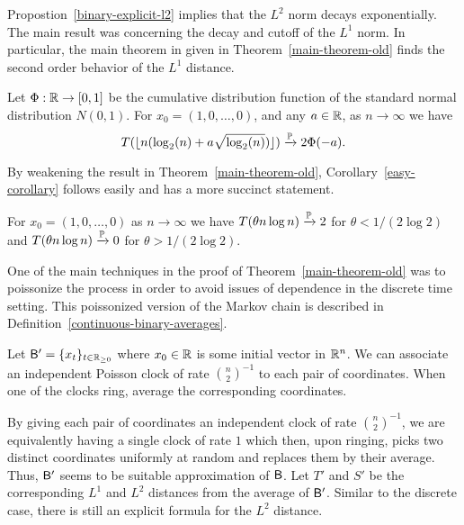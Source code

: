 \documentclass[12pt]{article}
\begin{document}
Propostion~\ref{binary-explicit-l2} implies that the $L^2$ norm decays exponentially. The main result \cite{chatterjee2021phase} was concerning the decay and cutoff of the $L^1$ norm. In particular, the main theorem in \cite{chatterjee2021phase} given in Theorem~\ref{main-theorem-old} finds the second order behavior of the $L^1$ distance. 

\begin{thm} \label{main-theorem-old}
	Let $\Phi : \mathbb{R} \to [0, 1]$ be the cumulative distribution function of the standard normal distribution $N(0, 1)$. For $x_0 = (1, 0, \ldots, 0)$, and any $a \in \mathbb{R}$, as $n \to \infty$ we have 
	\[
		T(\lfloor n(\log_2(n) + a \sqrt{\log_2(n)}) \rfloor) \xrightarrow{\mathbb{P}} 2 \Phi(-a).
	\]
\end{thm}

By weakening the result in Theorem~\ref{main-theorem-old}, Corollary~\ref{easy-corollary} follows easily and has a more succinct statement. 

\begin{cor} \label{easy-corollary}
	For $x_0 = (1, 0, \ldots, 0)$ as $n \to \infty$ we have $T(\theta n \log n) \xrightarrow{\mathbb{P}} 2$ for $\theta < 1/(2 \log 2)$ and $T(\theta n \log n) \xrightarrow{\mathbb{P}} 0$ for $\theta > 1/(2 \log 2)$. 
\end{cor}

One of the main techniques in the proof of Theorem~\ref{main-theorem-old} was to poissonize the process in order to avoid issues of dependence in the discrete time setting. This poissonized version of the Markov chain is described in Definition~\ref{continuous-binary-averages}. 

\begin{defn} \label{continuous-binary-averages}
	Let $\mathsf{B}' = \{x_t\}_{t \in \mathbb{R}_{\geq 0}}$ where $x_0 \in \mathbb{R}$ is some initial vector in $\mathbb{R}^n$. We can associate an independent Poisson clock of rate $\binom{n}{2}^{-1}$ to each pair of coordinates. When one of the clocks ring, average the corresponding coordinates.  
\end{defn}

By giving each pair of coordinates an independent clock of rate $\binom{n}{2}^{-1}$, we are equivalently having a single clock of rate $1$ which then, upon ringing, picks two distinct coordinates uniformly at random and replaces them by their average. Thus, $\mathsf{B}'$ seems to be suitable approximation of $\mathsf{B}$. Let $T'$ and $S'$ be the corresponding $L^1$ and $L^2$ distances from the average of $\mathsf{B}'$. Similar to the discrete case, there is still an explicit formula for the $L^2$ distance.
\end{document}
